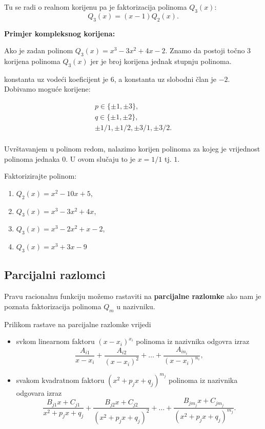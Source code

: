Tu se radi o realnom korijenu pa je faktorizacija polinoma $Q_3(x)$:
$$
Q_3(x) = (x-1)Q_2(x).
$$

\textbf{Primjer kompleksnog korijena:}

Ako je zadan polinom $Q_3(x) = x^3-3x^2+4x-2$. Znamo da postoji točno $3$
korijena polinoma $Q_3(x)$ jer je broj korijena jednak stupnju polinoma.



konstanta uz vodeći koeficijent je 6,
a konstanta uz slobodni član je $-2$. Dobivamo moguće korijene:

\begin{gather*}
p\in\{\pm1, \pm3\},\\
q\in\{\pm1, \pm2\},\\
\pm 1/1, \pm 1/2, \pm 3/1, \pm 3/2.\\
\end{gather*}

Uvrštavanjem u polinom redom, nalazimo korijen polinoma za kojeg je vrijednost
polinoma jednaka $0$. U ovom slučaju to je $x=1/1$ tj. $1$.


\begin{example}
    Faktorizirajte polinom:
    \begin{enumerate}
        \item $Q_2(x) = x^2-10x+5$,
        \item $Q_3(x) = x^3-3x^2+4x$,
        \item $Q_3(x) = x^3-2x^2+x-2$,
        \item $Q_3(x) = x^3+3x-9$
    \end{enumerate}
\end{example}

\subsection{Parcijalni razlomci}

Pravu racionalnu funkciju možemo rastaviti na \textbf{parcijalne razlomke} ako
nam je poznata faktorizacija polinoma $Q_m$ u nazivniku.

Prilikom rastave na parcijalne razlomke vrijedi
\begin{itemize}
    \item svkom linearnom faktoru $(x-x_i)^{x_i}$ polinoma iz nazivnika odgovra
    izraz
    $$
      \frac{A_{i1}}{x-x_i} + \frac{A_{i2}}{(x-x_i)^2} + \dots + \frac{A_{in_i}}{(x-x_i)^{n_i}},
    $$
    \item svakom kvadratnom faktoru $(x^2+p_jx+q_j)^{m_j}$ polinoma iz nazivnika
    odgovara izraz
    $$
      \frac{B_{j1}x+C_{j1}}{x^2+p_jx+q_j} + \frac{B_{j2}x+C_{j2}}{(x^2+p_jx+q_j)^2} + \dots + \frac{B_{jm_j}x+C_{jm_j}}{(x^2+p_jx+q_j)^{m_j}}.
    $$
\end{itemize}

